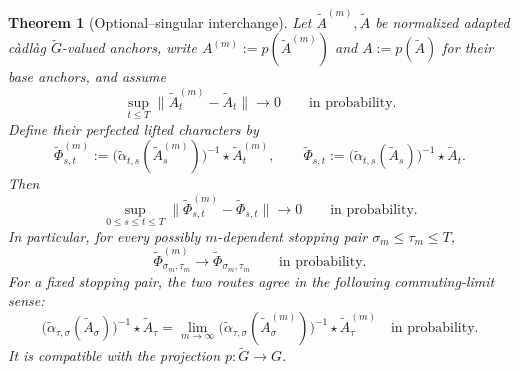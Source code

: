 \documentclass[10pt,reqno]{amsart}
\theoremstyle{plain}
\newtheorem{theorem}{Theorem}[section]
\theoremstyle{definition}
\theoremstyle{remark}
\begin{document}
\begin{theorem}[Optional--singular interchange]
\label{cc:thm-optional-singular-interchange}
Let \(\widetilde A^{(m)},\widetilde A\) be normalized adapted càdlàg
\(\widetilde G\)-valued anchors, write
\(A^{(m)}:=p(\widetilde A^{(m)})\) and
\(A:=p(\widetilde A)\) for their base anchors, and assume
\begin{equation}
 \sup_{t\le T}\|\widetilde A^{(m)}_t-\widetilde A_t\|
 \longrightarrow0
 \qquad\text{in probability}.
 \label{cc:eq-lifted-anchor-ucp}
\end{equation}
Define their perfected lifted characters by
\begin{equation}
 \widetilde\Phi^{(m)}_{s,t}
 :=\bigl(\widetilde\alpha_{t,s}(\widetilde A^{(m)}_s)\bigr)^{-1}
   \star\widetilde A^{(m)}_t,
 \qquad
 \widetilde\Phi_{s,t}
 :=\bigl(\widetilde\alpha_{t,s}(\widetilde A_s)\bigr)^{-1}
   \star\widetilde A_t.
 \label{cc:eq-lifted-perfect-characters}
\end{equation}
Then
\begin{equation}
 \sup_{0\le s\le t\le T}
 \|\widetilde\Phi^{(m)}_{s,t}-\widetilde\Phi_{s,t}\|
 \longrightarrow0
 \qquad\text{in probability}.
 \label{cc:eq-uniform-triangle-convergence}
\end{equation}
In particular, for every possibly \(m\)-dependent stopping pair
\(\sigma_m\le\tau_m\le T\),
\begin{equation}
 \widetilde\Phi^{(m)}_{\sigma_m,\tau_m}
 \longrightarrow\widetilde\Phi_{\sigma_m,\tau_m}
 \qquad\text{in probability}.
 \label{cc:eq-stopped-lift-convergence}
\end{equation}
For a fixed stopping pair, the two routes agree in the following
commuting-limit sense:
\begin{equation}
 \bigl(\widetilde\alpha_{\tau,\sigma}
       (\widetilde A_\sigma)\bigr)^{-1}
       \star\widetilde A_\tau
 =
 \lim_{m\to\infty}
 \bigl(\widetilde\alpha_{\tau,\sigma}
       (\widetilde A^{(m)}_\sigma)\bigr)^{-1}
       \star\widetilde A^{(m)}_\tau
 \quad\text{in probability}.
 \label{cc:eq-optional-limit-interchange}
\end{equation}
It is compatible with the projection \(p:\widetilde G\to G\).


\end{theorem}
\end{document}
